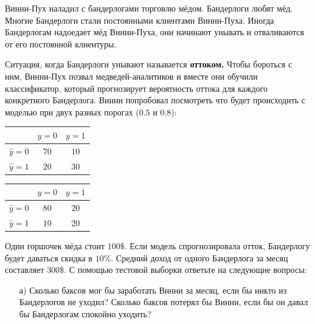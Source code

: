 \documentclass[12pt, a4paper, oneside]{article}
\theoremstyle{plain} %
\theoremstyle{definition}
\newcounter{problem}%
\renewcommand{\theproblem}{\arabic{problem}}
\newenvironment{problem}{
\addtocounter{problem}{1}\noindent{ \color{titleblue} \large \bfseries Упражнение~\theproblem \vspace{1ex} \newline}
}{ }
\newcommand{\indef}[1]{\textbf{ \color{green} #1}}
\begin{document}
\begin{problem} 
Винни-Пух наладил с бандерлогами торговлю мёдом. Бандерлоги любят мёд. Многие Бандерлоги стали постоянными клиентами Винни-Пуха. Иногда Бандерлогам надоедает мёд Винни-Пуха, они начинают унывать и отваливаются от его постоянной клиентуры. 

Ситуация, когда Бандерлоги унывают называется \indef{оттоком.} Чтобы бороться с ним, Винни-Пух позвал медведей-аналитиков и вместе они обучили классификатор, который прогнозирует вероятность оттока для каждого конкретного Бандерлога. Винни попробовал посмотреть что будет происходить с моделью при двух разных порогах ($0.5$ и $0.8$): 


\begin{minipage}[t]{0.45\textwidth}
\begin{center} 
	\begin{tabular}{|c|c|c|}
		\hline
		& $y=0$  &  $ y = 1$ \\  \hline 
		$\hat y = 0$  &   $70$ &    $10$ \\      \hline 
		$\hat y = 1$ &   $20$ &    $30$ \\      \hline
	\end{tabular}
\end{center} 
\end{minipage}
\begin{minipage}[t]{0.45\textwidth}
\begin{center} 
	\begin{tabular}{|c|c|c|}
		\hline
		& $y=0$  &  $ y = 1$ \\  \hline 
		$\hat y = 0$  &   $80$ &    $20$ \\      \hline 
		$\hat y = 1$ &   $10$ &    $20$ \\      \hline
	\end{tabular}
\end{center} 
\end{minipage}


Один горшочек мёда стоит $100\$$. Если модель спрогнозировала отток, Бандерлогу будет даваться скидка в $10\%$. Средний доход от одного Бандерлога за месяц составляет $300\$$. С помощью тестовой выборки ответьте на следующие вопросы:  

\begin{enumerate} 
\item[а)] Сколько баксов мог бы заработать Винни за месяц, если бы никто из Бандерлогов не уходил? Сколько баксов потерял бы Винни, если бы он давал бы Бандерлогам спокойно уходить? 


\end{enumerate}
\end{problem}
\end{document}
